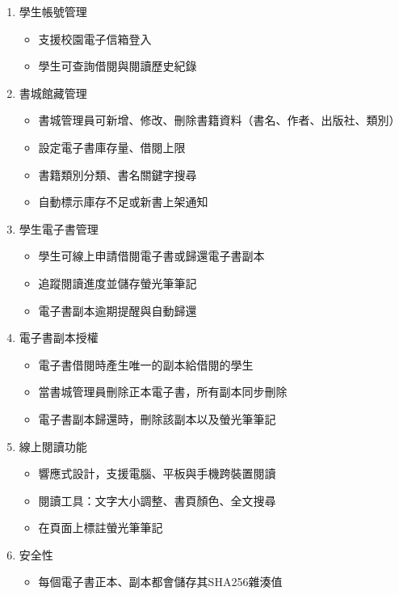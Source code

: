 \begin{enumerate}
    \item 學生帳號管理
    \begin{itemize}
        \item 支援校園電子信箱登入
        \item 學生可查詢借閱與閱讀歷史紀錄
    \end{itemize}

    \item 書城館藏管理
    \begin{itemize}
        \item 書城管理員可新增、修改、刪除書籍資料（書名、作者、出版社、類別）  
        \item 設定電子書庫存量、借閱上限
        \item 書籍類別分類、書名關鍵字搜尋
        \item 自動標示庫存不足或新書上架通知
    \end{itemize}

    \item 學生電子書管理
    \begin{itemize}
        \item 學生可線上申請借閱電子書或歸還電子書副本
        \item 追蹤閱讀進度並儲存螢光筆筆記
        \item 電子書副本逾期提醒與自動歸還
    \end{itemize}

    \item 電子書副本授權
    \begin{itemize}
        \item 電子書借閱時產生唯一的副本給借閱的學生
        \item 當書城管理員刪除正本電子書，所有副本同步刪除
        \item 電子書副本歸還時，刪除該副本以及螢光筆筆記
    \end{itemize}

    \item 線上閱讀功能
    \begin{itemize}
        \item 響應式設計，支援電腦、平板與手機跨裝置閱讀
        \item 閱讀工具：文字大小調整、書頁顏色、全文搜尋
        \item 在頁面上標註螢光筆筆記
    \end{itemize}

    \item 安全性
    \begin{itemize}
        \item 每個電子書正本、副本都會儲存其SHA256雜湊值
    \end{itemize}
\end{enumerate}

